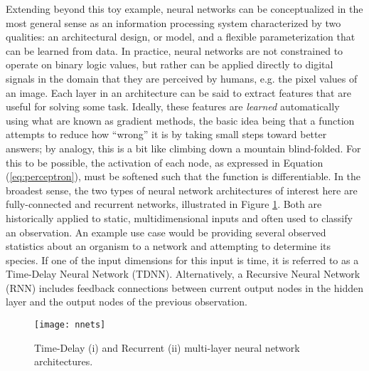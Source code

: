 Extending beyond this toy example, neural networks can be conceptualized in the most general sense as an information processing system characterized by two qualities: an architectural design, or model, and a flexible parameterization that can be learned from data.
In practice, neural networks are not constrained to operate on binary logic values, but rather can be applied directly to digital signals in the domain that they are perceived by humans, e.g. the pixel values of an image.
Each layer in an architecture can be said to extract features that are useful for solving some task.
Ideally, these features are \emph{learned} automatically using what are known as gradient methods, the basic idea being that a function attempts to reduce how ``wrong'' it is by taking small steps toward better answers; by analogy, this is a bit like climbing down a mountain blind-folded.
For this to be possible, the activation of each node, as expressed in Equation (\ref{eq:perceptron}), must be softened such that the function is differentiable.
In the broadest sense, the two types of neural network architectures of interest here are fully-connected and recurrent networks, illustrated in Figure \ref{fig:networks}.
Both are historically applied to static, multidimensional inputs and often used to classify an observation.
An example use case would be providing several observed statistics about an organism to a network and attempting to determine its species.
If one of the input dimensions for this input is time, it is referred to as a Time-Delay Neural Network (TDNN).
Alternatively, a Recursive Neural Network (RNN) includes feedback connections between current output nodes in the hidden layer and the output nodes of the previous observation.

\begin{figure}[!t]
\centering
\texttt{[image: nnets]}
\caption{\small{Time-Delay (i) and Recurrent (ii) multi-layer neural network architectures.}}
\label{fig:networks}
\end{figure}


